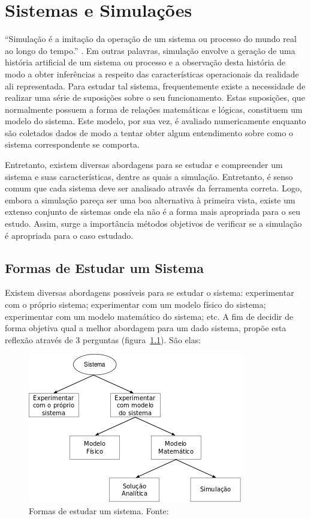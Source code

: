 \chapter{\label{chap:simulation}Sistemas e Simulações}

``Simulação é a imitação da operação de um sistema ou processo do mundo real ao
longo do tempo.'' \cite{Banks}. Em outras palavras, simulação envolve a geração
de uma história artificial de um sistema ou processo e a observação desta
história de modo a obter inferências a respeito das características operacionais
da realidade ali representada. Para estudar tal sistema, frequentemente existe a
necessidade de realizar uma série de suposições sobre o seu funcionamento. Estas
suposições, que normalmente possuem a forma de relações matemáticas e lógicas,
constituem um modelo do sistema. Este modelo, por sua vez, é avaliado
numericamente enquanto são coletados dados de modo a tentar obter algum
entendimento sobre como o sistema correspondente se comporta.

Entretanto, existem diversas abordagens para se estudar e compreender um sistema
e suas características, dentre as quais a simulação. Entretanto, é senso comum
que cada sistema deve ser analisado através da ferramenta correta. Logo, embora
a simulação pareça ser uma boa alternativa à primeira vista, existe um extenso
conjunto de sistemas onde ela não é a forma mais apropriada para o seu estudo.
Assim, surge a importância métodos objetivos de verificar se a simulação é
apropriada para o caso estudado.

\section{\label{chap:waystostudy}Formas de Estudar um Sistema}

Existem diversas abordagens possíveis para se estudar o sistema: experimentar
com o próprio sistema; experimentar com um modelo físico do sistema;
experimentar com um modelo matemático do sistema; etc. A fim de decidir de forma
objetiva qual a melhor abordagem para um dado sistema, \cite{Law} propõe esta
reflexão através de 3 perguntas (figura~\ref{fig:systemstudy}). São elas:

\begin{figure}[htb!]
\centering\includegraphics{img/systemstudy.png}
\caption{\label{fig:systemstudy}Formas de estudar um sistema. Fonte:~\cite{Law}}
\end{figure}

